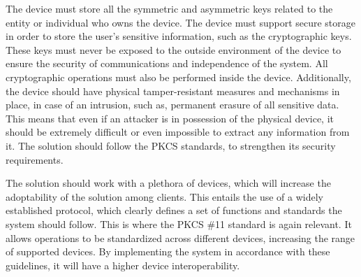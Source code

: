 The device must store all the symmetric and asymmetric keys related to the entity or individual who owns the device.
The device must support secure storage in order to store the user's sensitive information, such as the cryptographic keys.
These keys must never be exposed to the outside environment of the device to ensure the security of communications and independence of the system.
All cryptographic operations must also be performed inside the device.
Additionally, the device should have physical tamper-resistant measures and mechanisms in place, in case of an intrusion, such as, permanent erasure of all sensitive data. 
This means that even if an attacker is in possession of the physical device, it should be extremely difficult or even impossible to extract any information from it.
The solution should follow the \ac{PKCS} standards, to strengthen its security requirements.

The solution should work with a plethora of devices, which will increase the adoptability of the solution among clients. This entails the use of a widely established protocol, which clearly defines a set of functions and standards the system should follow.
This is where the \ac{PKCS} \#11 standard is again relevant. It allows operations to be standardized across different devices, increasing the range of supported devices. By implementing the system in accordance with these guidelines, it will have a higher device interoperability.

